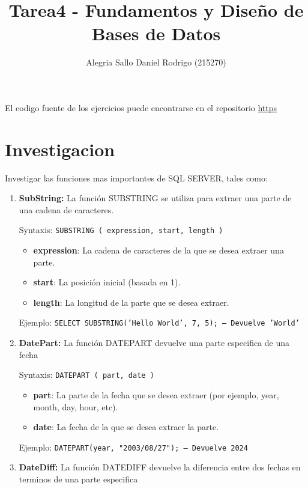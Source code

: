 \documentclass[a4paper,openany,11pt]{article}
\title{Tarea4 - Fundamentos y Diseño de Bases de Datos}
\author{Alegria Sallo Daniel Rodrigo (215270)}
\newcommand\skiplines[1]{\vspace{#1\baselineskip}}
\begin{document}
\maketitle

El codigo fuente de los ejercicios puede encontrarse en el repositorio
\url{https}

\section[5.1]{Investigacion}
Investigar las funciones mas importantes de SQL SERVER, tales como:

\begin{enumerate}
    \item \textbf{SubString:}
        La función SUBSTRING se utiliza para extraer una parte de una cadena de caracteres.

        Syntaxis: \texttt{SUBSTRING ( expression, start, length )}
        \begin{itemize}
            \item \textbf{expression}: La cadena de caracteres de la que se
                desea extraer una parte.
            \item \textbf{start}: La posición inicial (basada en 1).
            \item \textbf{length}: La longitud de la parte que se desea extraer.
        \end{itemize}

        Ejemplo: \texttt{SELECT SUBSTRING('Hello World', 7, 5); -- Devuelve 'World'}

    \skiplines{1}
    \item \textbf{DatePart:}
        La función DATEPART devuelve una parte especifica de una fecha

        Syntaxis: \texttt{DATEPART ( part, date )}
        \begin{itemize}
            \item \textbf{part}: La parte de la fecha que se desea extraer (por
                ejemplo, year, month, day, hour, etc).
            \item \textbf{date}: La fecha de la que se desea extraer la parte.
        \end{itemize}

        Ejemplo: \texttt{DATEPART(year, "2003/08/27"); -- Devuelve 2024}

    \skiplines{1}
    \item \textbf{DateDiff:}
        La función DATEDIFF devuelve la diferencia entre dos fechas en terminos
        de una parte especifica


\end{enumerate}
\end{document}
